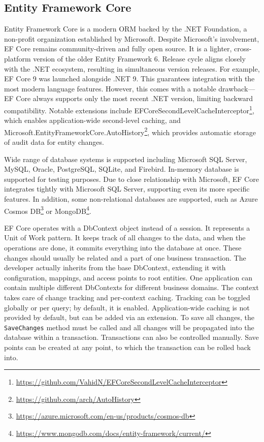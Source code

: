 \subsection{Entity Framework Core}
Entity Framework Core \cite{efcore, efcoreRepo} is a modern ORM backed by the .NET Foundation, a non-profit organization established by Microsoft. Despite Microsoft's involvement, EF Core remains community-driven and fully open source. It is a lighter, cross-platform version of the older Entity Framework 6. Release cycle aligns closely with the .NET ecosystem, resulting in simultaneous version releases. For example, EF Core 9 was launched alongside .NET 9. This guarantees integration with the most modern language features. However, this comes with a notable drawback---EF Core always supports only the most recent .NET version, limiting backward compatibility. Notable extensions include EFCoreSecondLevelCacheInterceptor\footnote{\url{https://github.com/VahidN/EFCoreSecondLevelCacheInterceptor}}, which enables application-wide second-level caching, and Microsoft.EntityFrameworkCore.AutoHistory\footnote{\url{https://github.com/arch/AutoHistory}}, which provides automatic storage of audit data for entity changes.

Wide range of database systems is supported including Microsoft SQL Server, MySQL, Oracle, PostgreSQL, SQLite, and Firebird. In-memory database is supported for testing purposes. Due to close relationship with Microsoft, EF Core integrates tightly with Microsoft SQL Server, supporting even its more specific features. In addition, some non-relational databases are supported, such as Azure Cosmos DB\footnote{\url{https://azure.microsoft.com/en-us/products/cosmos-db}} or MongoDB\footnote{\url{https://www.mongodb.com/docs/entity-framework/current/}}.

EF Core operates with a DbContext object instead of a session. It represents a Unit of Work pattern. It keeps track of all changes to the data, and when the operations are done, it commits everything into the database at once. These changes should usually be related and a part of one business transaction. \cite{FowlerUOW} The developer actually inherits from the base DbContext, extending it with configuration, mappings, and access points to root entities. One application can contain multiple different DbContexts for different business domains. The context takes care of change tracking and per-context caching. Tracking can be toggled globally or per query; by default, it is enabled. Application-wide caching is not provided by default, but can be added via an extension. To save all changes, the \texttt{SaveChanges} method must be called and all changes will be propagated into the database within a transaction. Transactions can also be controlled manually. Save points can be created at any point, to which the transaction can be rolled back into.

